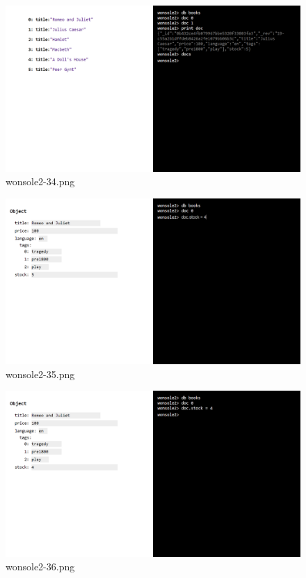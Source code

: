 \begin{figure}
\includegraphics[width=\textwidth]{screenshot/wonsole2/wonsole2-34.png}
\caption{wonsole2-34.png}
\label{wonsole2-34.png}
\end{figure}


\clearpage
\begin{figure}
\includegraphics[width=\textwidth]{screenshot/wonsole2/wonsole2-35.png}
\caption{wonsole2-35.png}
\label{wonsole2-35.png}
\end{figure}


\begin{figure}
\includegraphics[width=\textwidth]{screenshot/wonsole2/wonsole2-36.png}
\caption{wonsole2-36.png}
\label{wonsole2-36.png}
\end{figure}


